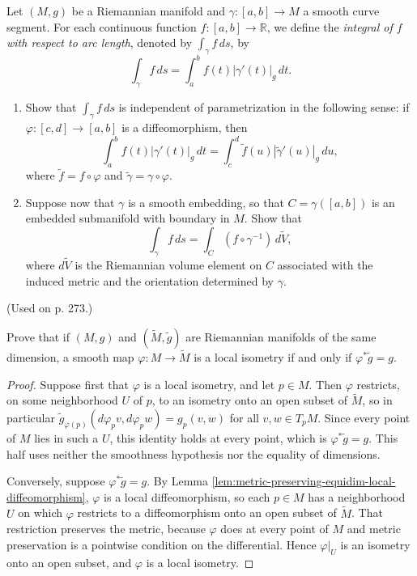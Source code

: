 \begin{exercise}\label{prob:arc-length-integral}
Let $(M,g)$ be a Riemannian manifold and $\gamma: [a,b] \to M$ a smooth curve segment. For each continuous function $f: [a,b] \to \mathbb{R}$, we define the \textit{integral of $f$ with respect to arc length}, denoted by $\int_\gamma f \, ds$, by
\[
\int_\gamma f \, ds = \int_a^b f(t) |\gamma'(t)|_g \, dt.
\]

\begin{enumerate}
\item[(a)] Show that $\int_\gamma f \, ds$ is independent of parametrization in the following sense: if $\varphi: [c,d] \to [a,b]$ is a diffeomorphism, then
\[
\int_a^b f(t) |\gamma'(t)|_g \, dt = \int_c^d \tilde{f}(u) |\tilde{\gamma}'(u)|_g \, du,
\]
where $\tilde{f} = f \circ \varphi$ and $\tilde{\gamma} = \gamma \circ \varphi$.
\item[(b)] Suppose now that $\gamma$ is a smooth embedding, so that $C = \gamma([a,b])$ is an embedded submanifold with boundary in $M$. Show that
\[
\int_\gamma f \, ds = \int_C (f \circ \gamma^{-1}) \, d\tilde{V},
\]
where $d\tilde{V}$ is the Riemannian volume element on $C$ associated with the induced metric and the orientation determined by $\gamma$.
\end{enumerate}

(Used on p. 273.)
\end{exercise}


\begin{exercise}
\label{exer:characterize-local-isometry}


Prove that if $(M,g)$ and $(\widetilde{M}, \widetilde{g})$ are Riemannian manifolds of the same dimension, a smooth map $\varphi: M \to \widetilde{M}$ is a local isometry if and only if $\varphi^* \widetilde{g} = g$.
\end{exercise}
\begin{proof}

Suppose first that $\varphi$ is a local isometry, and let $p \in M$. Then $\varphi$ restricts, on some neighborhood $U$ of $p$, to an isometry onto an open subset of $\widetilde{M}$, so in particular $\widetilde{g}_{\varphi(p)}(d\varphi_p v, d\varphi_p w) = g_p(v,w)$ for all $v,w \in T_pM$. Since every point of $M$ lies in such a $U$, this identity holds at every point, which is $\varphi^*\widetilde{g} = g$. This half uses neither the smoothness hypothesis nor the equality of dimensions.

Conversely, suppose $\varphi^* \widetilde{g} = g$. By Lemma \ref{lem:metric-preserving-equidim-local-diffeomorphism}, $\varphi$ is a local diffeomorphism, so each $p \in M$ has a neighborhood $U$ on which $\varphi$ restricts to a diffeomorphism onto an open subset of $\widetilde{M}$. That restriction preserves the metric, because $\varphi$ does at every point of $M$ and metric preservation is a pointwise condition on the differential. Hence $\varphi|_U$ is an isometry onto an open subset, and $\varphi$ is a local isometry.
\end{proof}


